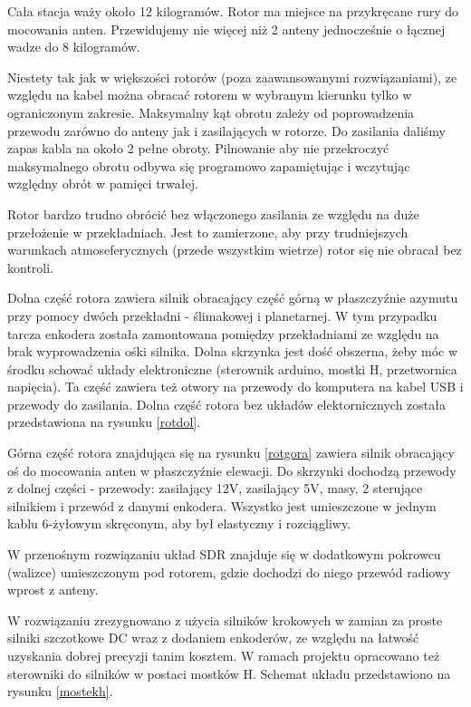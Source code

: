 Cała stacja waży około 12 kilogramów. Rotor ma miejsce na przykręcane rury do mocowania anten. Przewidujemy nie więcej niż 2 anteny jednocześnie o łącznej wadze do 8 kilogramów.

Niestety tak jak w większości rotorów (poza zaawansowanymi rozwiązaniami), ze względu na kabel można obracać rotorem w wybranym kierunku tylko w ograniczonym zakresie. Maksymalny kąt obrotu zależy od poprowadzenia przewodu zarówno do anteny jak i zasilających w rotorze. Do zasilania daliśmy zapas kabla na około 2 pełne obroty. Pilnowanie aby nie przekroczyć maksymalnego obrotu odbywa się programowo zapamiętując i wczytując względny obrót w pamięci trwałej. 

Rotor bardzo trudno obrócić bez włączonego zasilania ze względu na duże przełożenie w przekładniach. Jest to zamierzone, aby przy trudniejszych warunkach atmoseferycznych (przede wszystkim wietrze) rotor się nie obracał bez kontroli.

Dolna część rotora zawiera silnik obracający część górną w płaszczyźnie azymutu przy pomocy dwóch przekładni - ślimakowej i planetarnej. W tym przypadku tarcza enkodera została zamontowana pomiędzy przekładniami ze względu na brak wyprowadzenia ośki silnika. Dolna skrzynka jest dość obszerna, żeby móc w środku schować układy elektroniczne (sterownik arduino, mostki H, przetwornica napięcia). Ta część zawiera też otwory na przewody do komputera na kabel USB i przewody do zasilania. Dolna część rotora bez układów elektornicznych została przedstawiona na rysunku \ref{rotdol}.

Górna część rotora znajdująca się na rysunku \ref{rotgora} zawiera silnik obracający oś do mocowania anten w płaszczyźnie elewacji. Do skrzynki dochodzą przewody z dolnej części - przewody: zasilający 12V, zasilający 5V, masy, 2 sterujące silnikiem i przewód z danymi enkodera. Wszystko jest umieszczone w jednym kablu 6-żyłowym skręconym, aby był elastyczny i rozciągliwy. 

W przenośnym rozwiązaniu układ SDR znajduje się w dodatkowym pokrowcu (walizce) umieszczonym pod rotorem, gdzie dochodzi do niego przewód radiowy wprost z anteny.

W rozwiązaniu zrezygnowano z użycia silników krokowych w zamian za proste silniki szczotkowe DC wraz z dodaniem enkoderów, ze względu na łatwość uzyskania dobrej precyzji tanim kosztem. W ramach projektu opracowano też sterowniki do silników w postaci mostków H. Schemat układu przedstawiono na rysunku \ref{mostekh}.

